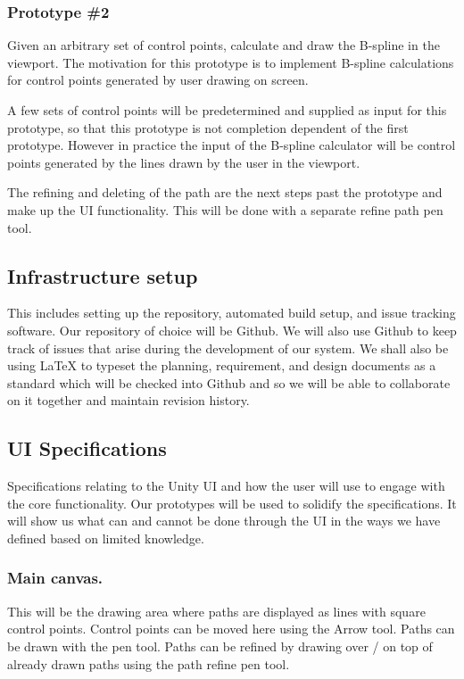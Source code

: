 \documentclass[12pt]{article}
\begin{document}
\subsubsection{Prototype \#2} 
\label{sec:ptype2}
Given an arbitrary set of control points, calculate and draw the B-spline in the viewport. The motivation for this prototype is to implement B-spline calculations for control points generated by user drawing on screen.

A few sets of control points will be predetermined and supplied as input for this prototype, so that this prototype is not completion dependent of the first prototype. However in practice the input of the B-spline calculator will be control points generated by the lines drawn by the user in the viewport.

The refining and deleting of the path are the next steps past the prototype and make up the UI functionality. This will be done with a separate refine path pen tool.

\subsection{Infrastructure setup}
This includes setting up the repository, automated build setup, and issue tracking software. Our repository of choice will be Github. We will also use Github to keep track of issues that arise during the development of our system. We shall also be using LaTeX to typeset the planning, requirement, and design documents as a standard which will be checked into Github and so we will be able to collaborate on it together and maintain revision history.

\subsection{UI Specifications}
Specifications relating to the Unity UI and how the user will use to engage with the core functionality. Our prototypes will be used to solidify the specifications. It will show us what can and cannot be done through the UI in the ways we have defined based on limited knowledge.

\subsubsection{Main canvas.} This will be the drawing area where paths are displayed as lines with square control points. Control points can be moved here using the Arrow tool. Paths can be drawn with the pen tool. Paths can be refined by drawing over / on top of already drawn paths using the path refine pen tool.
\end{document}
